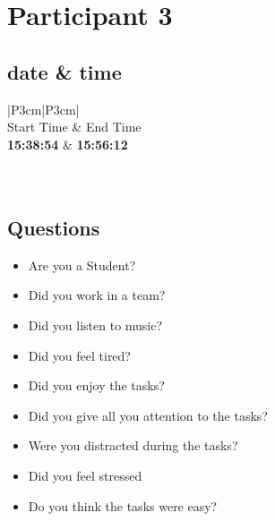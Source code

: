 \section{Participant 3}


\subsection{date \& time}
\begin{table}[ht]
  \begin{tabular}{|P{3cm}|P{3cm}|}
	    	\\ \hline
    Start Time      			& End Time   					\\ \hline
   \textbf{15:38:54} 	& \textbf{15:56:12}    	\\ \hline
       						\\ \hline
    			\\ \hline
  \end{tabular}
  \newline\newline
  \caption{p3: date and time}\label{dandt3}
\end{table}

\subsection{Questions}
\begin{itemize}
  \item[\Checkmark] Are you a Student?
  \item[\XSolidBrush] Did you work in a team?
  \item[\XSolidBrush] Did you listen to music?
  \item[\Checkmark] Did you feel tired?
  \item[\XSolidBrush] Did you enjoy the tasks?
  \item[\XSolidBrush] Did you give all you attention to the tasks?
  \item[\XSolidBrush] Were you distracted during the tasks?
  \item[\Checkmark] Did you feel stressed
  \item[\XSolidBrush] Do you think the tasks were easy?  
\end{itemize}

\newpage

